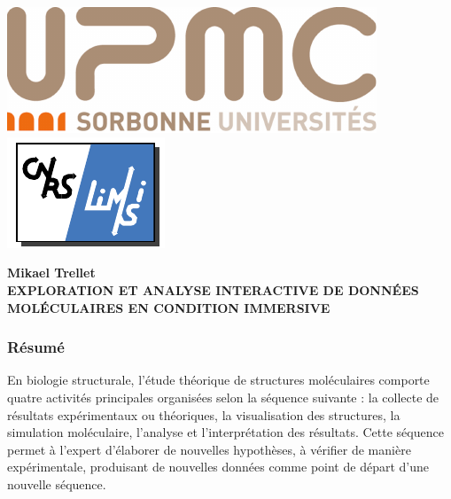 \backmatter 
\chapter*{}%
\pagestyle{empty}

\setlength{\headheight}{0.pt}
        
\includegraphics[height=1.cm]{./figures/UPMC_these.pdf}\hfill
\includegraphics[height=1.cm]{./figures/limsilogo_vectoriel.pdf}\hfill


\begin{center}
 \textbf{Mikael Trellet} \\
 \textbf{EXPLORATION ET ANALYSE INTERACTIVE DE DONNÉES MOLÉCULAIRES EN CONDITION IMMERSIVE}
\end{center}
    

\footnotesize
\subsection*{Résumé}












\footnotesize
En biologie structurale, l'étude théorique de structures moléculaires comporte quatre activités principales organisées selon la séquence suivante : la collecte de résultats expérimentaux ou théoriques, la visualisation des structures, la simulation moléculaire, l'analyse et l'interprétation des résultats. Cette séquence permet à l'expert d'élaborer de nouvelles hypothèses, à vérifier de manière expérimentale, produisant de nouvelles données comme point de départ d'une nouvelle séquence.

